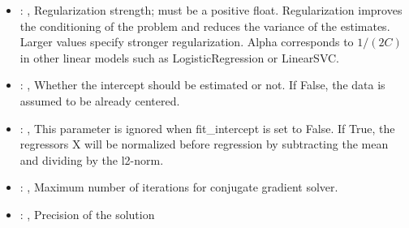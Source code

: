 \begin{itemize}
    \item {}: , 
      Regularization strength; must be a positive float. Regularization
      improves the conditioning of the problem and reduces the variance of the estimates.
      Larger values specify stronger regularization. Alpha corresponds to $1 / (2C)$ in other
      linear models such as LogisticRegression or LinearSVC.

    \item {}: , 
      Whether the intercept should be estimated or not. If False,
      the data is assumed to be already centered.

    \item {}: , 
      This parameter is ignored when fit\_intercept is set to False. If True, the
      regressors X will be normalized before regression by subtracting the mean and dividing
      by the l2-norm.

    \item {}: , 
      Maximum number of iterations for conjugate gradient solver.

    \item {}: , 
      Precision of the solution


\end{itemize}
